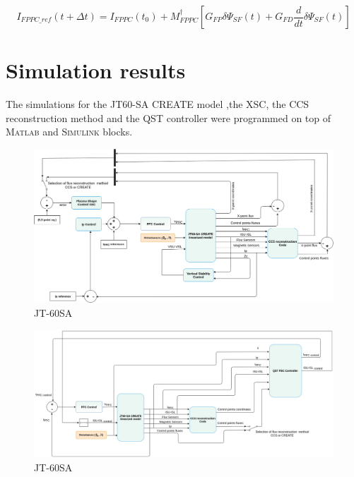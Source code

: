\begin{equation}
I_{FPPC\_ref}(t+\Delta t)=I_{FPPC}(t_0)+ M^\dagger_{FPPC}\left[G_{FP}\delta \Psi_{SF}(t) + G_{FD}\frac{d}{dt}\delta\Psi_{SF}(t) \right]
\end{equation}



\section{Simulation results}	

 The simulations for  the JT60-SA CREATE model ,the XSC, the CCS reconstruction method and the QST controller  were programmed on top of  \textsc{Matlab} and \textsc{Simulink} blocks.
 
 
\begin{figure}
	\centering
	\includegraphics[width=1.05\textwidth]{Chp3/JT60Schemes1.png}
	\caption{	\label{JT60controlscheme}JT-60SA }
\end{figure}

\begin{figure}
	\centering
	\includegraphics[width=1.05\textwidth]{Chp3/JT60SchemeFBCnew.png}
	\caption{	\label{JT60FBCcheme}JT-60SA }
\end{figure}



